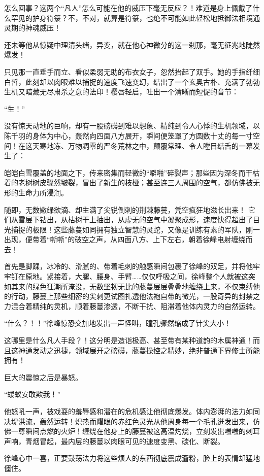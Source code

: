 怎么回事？这两个“凡人”怎么可能在他的威压下毫无反应？！难道是身上佩戴了什么罕见的护身符箓？不，不对，就算是符箓，也绝不可能如此轻松地抵御法相境通灵期的神魂威压！

还未等他从惊疑中理清头绪，异变，就在他心神微分的这一刹那，毫无征兆地陡然爆发！

只见那一直垂手而立、看似柔弱无助的布衣女子，忽然抬起了双手。她的手指纤细白皙，此刻却以肉眼难以捕捉的速度飞速变幻，结出了一个玄奥古朴、充满了勃勃生机又暗藏无尽肃杀之意的法印！樱唇轻启，吐出一个清晰而短促的音节：

“生！”

没有惊天动地的巨响，却有一股磅礴到难以想象、精纯到令人心悸的生机领域，以陈千羽的身体为中心，轰然向四面八方展开，瞬间便笼罩了方圆数十丈的每一寸空间！在这天寒地冻、万物凋零的严冬荒林之中，颠覆常理、令人瞠目结舌的一幕发生了：

皑皑白雪覆盖的地面之下，传来密集而轻微的“噼啪”碎裂声；那些因为深冬而干枯着的老树树皮骤然皲裂，冒出了新生的枝桠；甚至连三人周围的空气，都仿佛被无形的生命力所浸润。

随即，无数嫩绿欲滴、却生满了尖锐倒刺的荆棘藤蔓，凭空疯狂地滋长出来！ 它们从雪层下钻出，从枯树干上抽出，从虚无的空气中凝聚成形，速度快得超出了目光捕捉的极限！这些藤蔓如同拥有独立智慧的灵蛇，又像是训练有素的军队，刚一出现，便带着“嘶嘶”的破空之声，从四面八方、上下左右，朝着徐峰电射缠绕而去！

首先是脚踝，冰冷的、滑腻的、带着毛刺的触感瞬间包裹了徐峰的双足，并将他牢牢钉在原地。紧接着，大腿、腰身、手臂……仅仅呼吸之间，徐峰整个人就被这突如其来的绿色狂潮所淹没，无数坚韧无比的藤蔓层层叠叠地缠绕上来，不仅束缚他的行动，藤蔓上那些细密的尖刺更试图扎透他法袍自带的微光，一股奇异的封禁之力混合着精纯的灵机，顺着藤蔓渗透，不断干扰、阻滞着他体内灵力的自然运转。

“什么？！！”徐峰惊恐交加地发出一声怪叫，瞳孔骤然缩成了针尖大小！

这哪里是什么凡人手段？！这分明是造诣极高、甚至带有某种道韵的木属神通！而且这神通发动之迅捷，领域展开之磅礴，藤蔓操控之精妙，绝非普通下界修士所能拥有！

巨大的震惊之后是暴怒。

“蝼蚁安敢欺我！”

他怒吼一声，被戏耍的羞辱感和潜在的危机感让他彻底爆发。体内澎湃的法力如同决堤洪流，轰然运转！炽热而耀眼的赤红色灵光从他周身每一个毛孔迸发出来，仿佛一尊瞬间点燃的火炉！缠绕在他身上的藤蔓被这高温灼烧，立刻发出嗤嗤的刺耳声响，青烟冒起，最内层的藤蔓以肉眼可见的速度变黑、碳化、断裂。

徐峰心中一喜，正要鼓荡法力将这些烦人的东西彻底震成齑粉，脸上的表情却猛地僵住。

